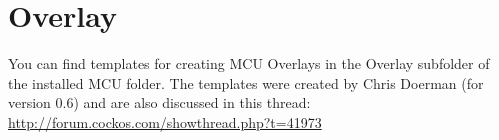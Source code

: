 \section{Overlay}\label{overlay}

You can find templates for creating MCU Overlays in the Overlay
subfolder of the installed MCU folder. The templates were
created by Chris Doerman (for version 0.6) and are also discussed in this thread:
\url{http://forum.cockos.com/showthread.php?t=41973}
